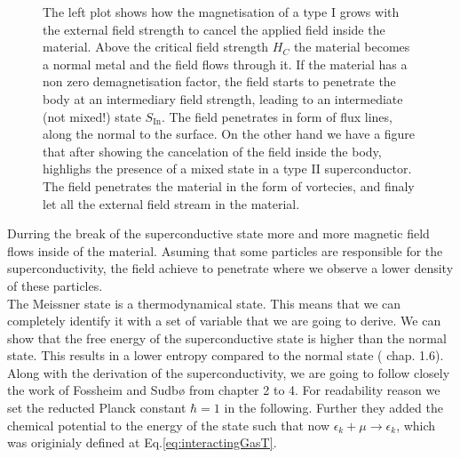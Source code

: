 \documentclass[../main.tex]{subfile}
\begin{document}
\begin{figure}[H]
        
            \caption{The left plot shows how the magnetisation of a type I grows with the external field strength to cancel the applied field inside the material. Above
            the critical field strength $H_C$ the material becomes a normal metal and the field flows through it. If the material has a non zero demagnetisation factor,
            the field starts to penetrate the body at an intermediary field strength, leading to an intermediate (not mixed!) state \textcolor{TamLightGreen}{$S_{\text{In}}$}.
             The field penetrates in form of
            flux lines, along the normal to the surface. On the other hand we have a figure
            that after showing the cancelation of the field inside the body, highlighs the presence of a mixed state in a type II superconductor. The field penetrates 
            the material in the form of vortecies, and finaly let all the external field stream in the material.}
        \end{figure}
Durring the break of the superconductive state more and more magnetic field 
flows inside of the material. Asuming that some particles are responsible for the superconductivity, the field achieve to penetrate where we observe 
a lower density of these particles.\\

The Meissner state is a thermodynamical state. This means that we can completely identify it with a set of variable that we are going to derive.
We can show that the free energy of the superconductive state is higher than the normal state. 
This results in a lower entropy compared to the normal state (\cite{FossheimSudbo2004} chap. 1.6).
Along with the derivation of the superconductivity, we are going to follow closely the work of Fossheim and Sudbø \cite{FossheimSudbo2004} from chapter 2 to 4.
For readability reason we set the reducted Planck constant $\hbar = 1$ in the following. Further they added the chemical potential to the energy of the state such
that now $\epsilon_k + \mu \rightarrow \epsilon_k $, which was originialy defined at Eq.\ref{eq:interactingGasT}.\\
\end{document}
